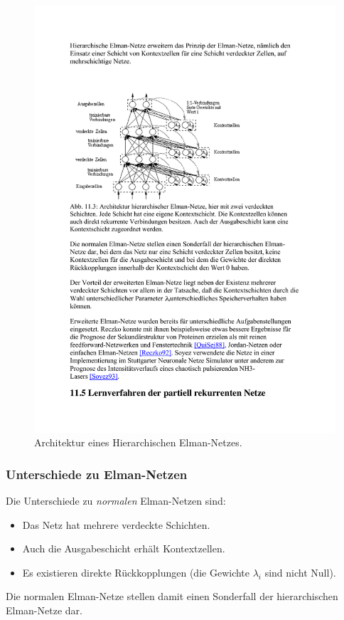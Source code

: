 \begin{figure}[ht!] \centering 
	\includegraphics[width=\linewidth]{figures/ch04_hierarchische-elman-netze.pdf}
	\caption{Architektur eines Hierarchischen Elman-Netzes.}
	\label{fig:ch04_hierarchische-elman-netze}
\end{figure}

\subsubsection*{Unterschiede zu Elman-Netzen}
Die Unterschiede zu \textit{normalen} Elman-Netzen sind:
\begin{itemize}
	\item Das Netz hat mehrere verdeckte Schichten.
	\item Auch die Ausgabeschicht erhält Kontextzellen.
	\item Es existieren direkte Rückkopplungen (die Gewichte $\lambda_i$ sind nicht Null). 
\end{itemize}
Die normalen Elman-Netze stellen damit einen Sonderfall der hierarchischen Elman-Netze dar.

